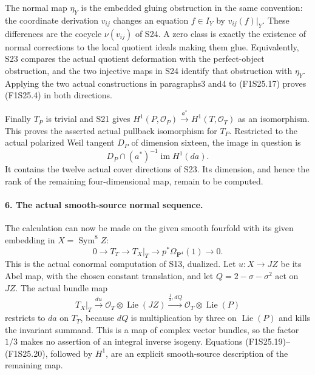 The normal map $\eta_Y$ is the embedded gluing obstruction in
the same convention: the coordinate derivation $v_{ij}$ changes
an equation $f\in I_Y$ by $v_{ij}(f)|_Y$. These differences
are the cocycle $\nu(v_{ij})$ of S24. A zero class is exactly
the existence of normal corrections to the local quotient
ideals making them glue. Equivalently, S23 compares the actual
quotient deformation with the perfect-object obstruction, and
the two injective maps in S24 identify that obstruction with
$\eta_Y$. Applying the two actual constructions in paragraphs3
and4 to (F1S25.17) proves (F1S25.4) in both directions.

Finally $T_P$ is trivial and S21 gives
$H^1(P,\mathcal O_P)\xrightarrow{a^*}H^1(T,\mathcal O_T)$
as an isomorphism. This proves the asserted actual pullback
isomorphism for $T_P$. Restricted to the actual polarized Weil
tangent $D_P$ of dimension sixteen, the image in question is
\[
 D_P\cap(a^*)^{-1}\operatorname{im}H^1(da).
 \tag{F1S25.18}
\]
It contains the twelve actual cover directions of S23. Its
dimension, and hence the rank of the remaining four-dimensional
map, remain to be computed.

\paragraph{6. The actual smooth-source normal sequence.}
The calculation can now be made on the given smooth fourfold
with its given embedding in $X=\operatorname{Sym}^8Z$:
\[
 0\longrightarrow T_T\longrightarrow T_X|_T
       \longrightarrow p^*\Omega_{\mathbf P^4}(1)
       \longrightarrow0.
 \tag{F1S25.19}
\]
This is the actual conormal computation of S13, dualized.
Let $u:X\to JZ$ be its Abel map, with the chosen constant
translation, and let $Q=2-\sigma-\sigma^2$ act on $JZ$.
The actual bundle map
\[
 T_X|_T\xrightarrow{du}\mathcal O_T\otimes\operatorname{Lie}(JZ)
      \xrightarrow{\frac13,dQ}
                   \mathcal O_T\otimes\operatorname{Lie}(P)
 \tag{F1S25.20}
\]
restricts to $da$ on $T_T$, because $dQ$ is multiplication
by three on $\operatorname{Lie}(P)$ and kills the invariant
summand. This is a map of complex vector bundles, so the
factor $1/3$ makes no assertion of an integral inverse isogeny.
Equations (F1S25.19)--(F1S25.20), followed by $H^1$, are an
explicit smooth-source description of the remaining map.

